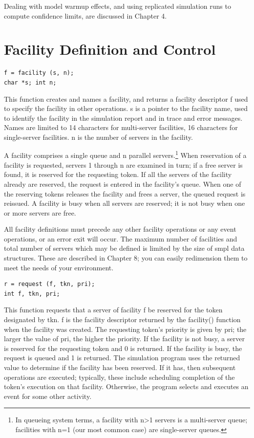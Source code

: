 Dealing with model warmup effects, and using replicated simulation runs to
compute confidence limits, are discussed in Chapter 4.

\section{Facility Definition and Control}
\label{sec:smpl-facility-definition}

\begin{verbatim}
f = facility (s, n);
char *s; int n;
\end{verbatim}

This function creates and names a facility, and returns a facility descriptor
f used to specify the facility in other operations. s is a pointer to the
facility name, used to identify the facility in the simulation report and in
trace and error messages. Names are limited to 14 characters for multi-server
facilities, 16 characters for single-server facilities. n is the number of
servers in the facility.

A facility comprises a single queue and n parallel servers.\footnote{In
queueing system terms, a facility with n>1 servers is a multi-server queue;
facilities with n=1 (our most common case) are single-server queues.} When
reservation of a facility is requested, servers 1 through n are examined in
turn; if a free server is found, it is reserved for the requesting token. If
all the servers of the facility already are reserved, the request is entered
in the facility's queue. When one of the reserving tokens releases the
facility and frees a server, the queued request is reissued. A facility is
busy when all servers are reserved; it is not busy when one or more servers
are free.

All facility definitions must precede any other facility operations or any
event operations, or an error exit will occur. The maximum number of
facilities and total number of servers which may be defined is limited by the
size of smpl data structures. These are described in Chapter 8; you can easily
redimension them to meet the needs of your environment.

\begin{verbatim}
r = request (f, tkn, pri);
int f, tkn, pri;
\end{verbatim}

This function requests that a server of facility f be reserved for the token
designated by tkn. f is the facility descriptor returned by the facility()
function when the facility was created. The requesting token's priority is
given by pri; the larger the value of pri, the higher the priority. If the
facility is not busy, a server is reserved for the requesting token and 0 is
returned. If the facility is busy, the request is queued and 1 is returned.
The simulation program uses the returned value to determine if the facility
has been reserved. If it has, then subsequent operations are executed;
typically, these include scheduling completion of the token's execution on
that facility. Otherwise, the program selects and executes an event for some
other activity.

